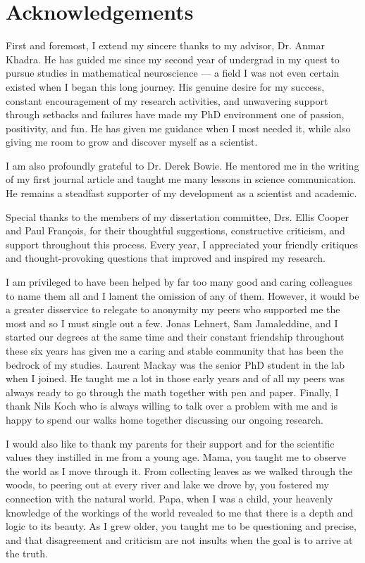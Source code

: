 \documentclass[11pt]{report}
\begin{document}
\newpage
\chapter*{Acknowledgements}

First and foremost, I extend my sincere thanks to my advisor, Dr. Anmar Khadra. He has guided me since my second year of undergrad in my quest to pursue studies in mathematical neuroscience --- a field I was not even certain existed when I began this long journey. His genuine desire for my success, constant encouragement of my research activities, and unwavering support through setbacks and failures have made my PhD environment one of passion, positivity, and fun. He has given me guidance when I most needed it, while also giving me room to grow and discover myself as a scientist. 

I am also profoundly grateful to Dr. Derek Bowie. He mentored me in the writing of my first journal article and taught me many lessons in science communication. He remains a steadfast supporter of my development as a scientist and academic.

Special thanks to the members of my dissertation committee, Drs. Ellis Cooper and Paul François, for their thoughtful suggestions, constructive criticism, and support throughout this process. Every year, I appreciated your friendly critiques and thought-provoking questions that improved and inspired my research.

I am privileged to have been helped by far too many good and caring colleagues to name them all and I lament the omission of any of them. However, it would be a greater disservice to relegate to anonymity my peers who supported me the most and so I must single out a few. Jonas Lehnert, Sam Jamaleddine, and I started our degrees at the same time and their constant friendship throughout these six years has given me a caring and stable community that has been the bedrock of my studies. Laurent Mackay was the senior PhD student in the lab when I joined. He taught me a lot in those early years and of all my peers was always ready to go through the math together with pen and paper. Finally, I thank Nils Koch who is always willing to talk over a problem with me and is happy to spend our walks home together discussing our ongoing research.

I would also like to thank my parents for their support and for the scientific values they instilled in me from a young age. Mama, you taught me to observe the world as I move through it. From collecting leaves as we walked through the woods, to peering out at every river and lake we drove by, you fostered my connection with the natural world. Papa, when I was a child, your heavenly knowledge of the workings of the world revealed to me that there is a depth and logic to its beauty. As I grew older, you taught me to be questioning and precise, and that disagreement and criticism are not insults when the goal is to arrive at the truth.
\end{document}

